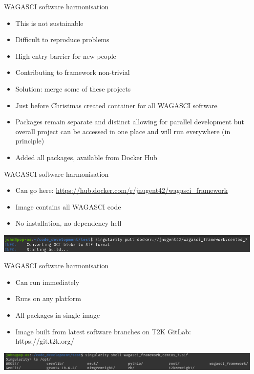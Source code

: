 \documentclass{beamer}
\begin{document}
\begin{frame}{WAGASCI software harmonisation}

    \begin{itemize}
\item This is not sustainable
\item Difficult to reproduce problems
\item High entry barrier for new people
\item Contributing to framework non-trivial 
\item Solution: merge some of these projects
\item Just before Christmas created container for all WAGASCI software 
\item Packages remain separate and distinct allowing for parallel development but overall project can be accessed in one place and will run everywhere (in principle)
\item Added all packages, available from Docker Hub
\end{itemize}

\end{frame}

\begin{frame}{WAGASCI software harmonisation}
    \begin{itemize}
        \item Can go here: \url{https://hub.docker.com/r/jnugent42/wagasci_framework}
        \item Image contains all WAGASCI code
        \item No installation, no dependency hell
    \end{itemize}
    \includegraphics[width=\textwidth]{images/Screenshot from 2023-01-23 11-11-52.png}
\end{frame}

\begin{frame}{WAGASCI software harmonisation}
    \begin{itemize}
        \item Can run immediately
        \item Runs on any platform
        \item All packages in single image
        \item Image built from latest software branches on T2K GitLab: https://git.t2k.org/
    \end{itemize}
        \includegraphics[width=\textwidth]{images/Screenshot from 2023-01-23 11-13-35.png}
\end{frame}
\end{document}
